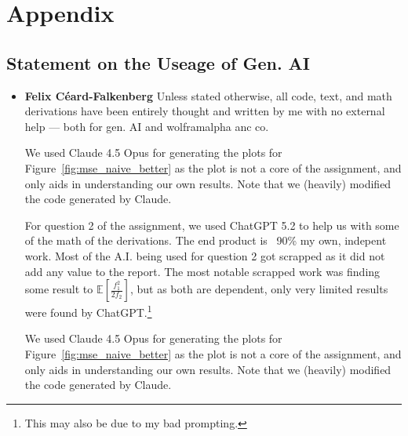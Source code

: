 \appendix
\chapter{Appendix}

\section{Statement on the Useage of Gen. AI}
\begin{itemize}
    \item \textbf{Felix Céard-Falkenberg}\newline
Unless stated otherwise, all code, text, and math derivations have been entirely thought and written by me with no external help --- both for gen. AI and wolframalpha anc co.

We used Claude 4.5 Opus for generating the plots for Figure~\ref{fig:mse_naive_better} as the plot is not a core of the assignment, and only aids in understanding our own results. Note that we (heavily) modified the code generated by Claude.

For question 2 of the assignment, we used ChatGPT 5.2 to help us with some of the math of the derivations. The end product is ~90\% my own, indepent work. 
Most of the A.I. being used for question 2 got scrapped as it did not add any value to the report. The most notable scrapped work was finding some result to $\mathbb{E}\left[ \frac{f_1^2}{2f_2} \right]$, but as both are dependent, only very limited results were found by ChatGPT.\!\footnote{This may also be due to my bad prompting.}




We used Claude 4.5 Opus for generating the plots for Figure~\ref{fig:mse_naive_better} as the plot is not a core of the assignment, and only aids in understanding our own results. Note that we (heavily) modified the code generated by Claude. 


\end{itemize}
